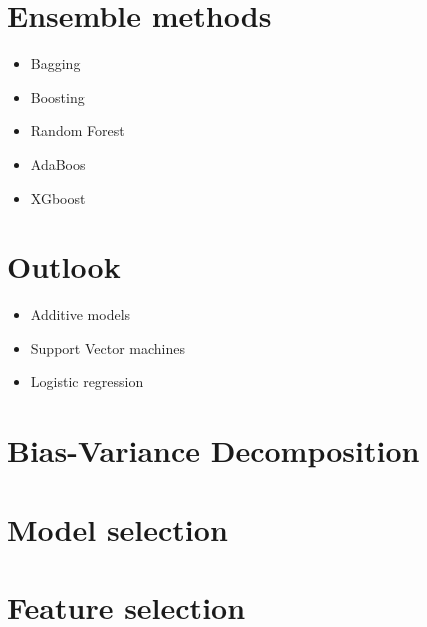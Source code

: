 \documentclass[12pt,a4paper]{article}
\begin{document}
\section{Ensemble methods}
\begin{itemize}\itemsep0em 
	\item Bagging
	\item Boosting
	\item Random Forest
	\item AdaBoos
	\item XGboost	
\end{itemize}
\section{Outlook}
\begin{itemize} \itemsep0em
	\item Additive models
	\item Support Vector machines
	\item Logistic regression
\end{itemize}
\section{Bias-Variance Decomposition}
\section{Model selection}
\section{Feature selection}



\end{document}
